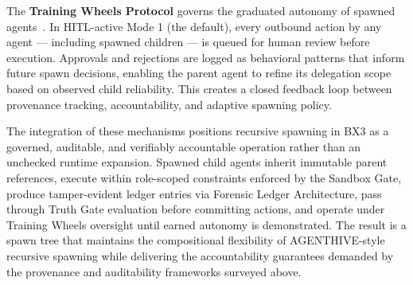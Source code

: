 The \textbf{Training Wheels Protocol} governs the graduated autonomy of spawned agents~\cite{sovereignagent}. In HITL-active Mode 1 (the default), every outbound action by any agent — including spawned children — is queued for human review before execution. Approvals and rejections are logged as behavioral patterns that inform future spawn decisions, enabling the parent agent to refine its delegation scope based on observed child reliability. This creates a closed feedback loop between provenance tracking, accountability, and adaptive spawning policy.

The integration of these mechanisms positions recursive spawning in BX3 as a governed, auditable, and verifiably accountable operation rather than an unchecked runtime expansion. Spawned child agents inherit immutable parent references, execute within role-scoped constraints enforced by the Sandbox Gate, produce tamper-evident ledger entries via Forensic Ledger Architecture, pass through Truth Gate evaluation before committing actions, and operate under Training Wheels oversight until earned autonomy is demonstrated. The result is a spawn tree that maintains the compositional flexibility of AGENTHIVE-style recursive spawning while delivering the accountability guarantees demanded by the provenance and auditability frameworks surveyed above.
